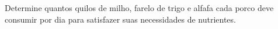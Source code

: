 \documentclass[pdftex, brazil, 12pt, oneside, addpoints]{exam}
\begin{document}
\begin{questions}
Determine quantos quilos de milho, farelo de trigo e alfafa cada porco deve
consumir por dia para satisfazer suas necessidades de nutrientes.




\end{questions}
\end{document}
